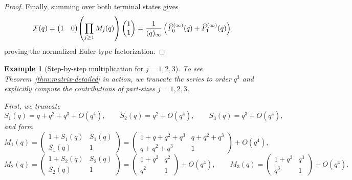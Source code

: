 \documentclass[letterpaper,12pt]{article}
\newtheorem{example}{Example}
\begin{document}
\begin{proof}
 
Finally, summing over both terminal states gives
\[
\mathcal{F}(q)
=
\begin{pmatrix}1&0\end{pmatrix}
\!\left(\prod_{j\ge1} M_j(q)\right)
\begin{pmatrix}1\\1\end{pmatrix}
=
\frac{1}{(q)_\infty}\,
\Bigl(\widehat{F}_0^{(\infty)}(q)+\widehat{F}_1^{(\infty)}(q)\Bigr),
\]
proving the normalized Euler-type factorization.
\end{proof}

\begin{example}[Step-by-step multiplication for \(j=1,2,3\)]\label{ex:M123}
To see Theorem~\ref{thm:matrix-detailed} in action, we truncate the series to
order \(q^3\) and explicitly compute the contributions of part-sizes
\(j=1,2,3\).

First, we truncate
\[
S_1(q) = q + q^2 + q^3 + O(q^4),\qquad
S_2(q) = q^2 + O(q^4),\qquad
S_3(q) = q^3 + O(q^4),
\]
and form
\[
M_1(q) =
\begin{pmatrix}
1+S_1(q) & S_1(q)\\
S_1(q) & 1
\end{pmatrix}
=
\begin{pmatrix}
1+q+q^2+q^3 & q+q^2+q^3\\
q+q^2+q^3 & 1
\end{pmatrix}
+ O(q^4),
\]
\[
M_2(q) =
\begin{pmatrix}
1+S_2(q) & S_2(q)\\
S_2(q) & 1
\end{pmatrix}
=
\begin{pmatrix}
1+q^2 & q^2\\
q^2 & 1
\end{pmatrix}
+ O(q^4),
\qquad
M_3(q) =
\begin{pmatrix}
1+q^3 & q^3\\
q^3 & 1
\end{pmatrix}
+ O(q^4).
\]


\end{example}
\end{document}
